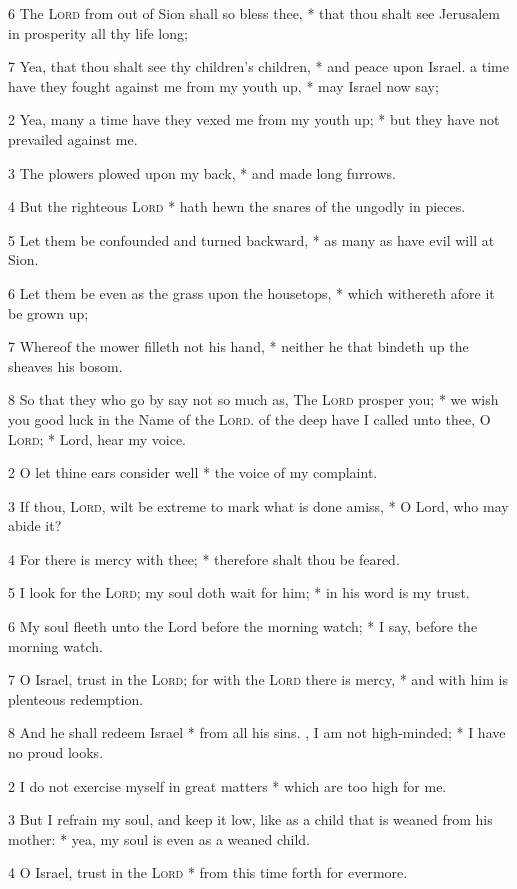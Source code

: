 6 The {\textsc{Lord}} from out of Sion shall so bless thee, * that thou shalt see Jerusalem in prosperity all thy life long;\par
7 Yea, that thou shalt see thy children's children, * and peace upon Israel.
 a time have they fought against me from my youth up, * may Israel now say;\par
2 Yea, many a time have they vexed me from my youth up; * but they have not prevailed against me.\par
3 The plowers plowed upon my back, * and made long furrows.\par
4 But the righteous {\textsc{Lord}} * hath hewn the snares of the ungodly in pieces.\par
5 Let them be confounded and turned backward, * as many as have evil will at Sion.\par
6 Let them be even as the grass upon the housetops, * which withereth afore it be grown up;\par
7 Whereof the mower filleth not his hand, * neither he that bindeth up the sheaves his bosom.\par
8 So that they who go by say not so much as, The {\textsc{Lord}} prosper you; * we wish you good luck in the Name of the {\textsc{Lord}}.
 of the deep have I called unto thee, O {\textsc{Lord}}; * Lord, hear my voice.\par
2 O let thine ears consider well * the voice of my complaint.\par
3 If thou, {\textsc{Lord}}, wilt be extreme to mark what is done amiss, * O Lord, who may abide it?\par
4 For there is mercy with thee; * therefore shalt thou be feared.\par
5 I look for the {\textsc{Lord}}; my soul doth wait for him; * in his word is my trust.\par
6 My soul fleeth unto the Lord before the morning watch; * I say, before the morning watch.\par
7 O Israel, trust in the {\textsc{Lord}}; for with the {\textsc{Lord}} there is mercy, * and with him is plenteous redemption.\par
8 And he shall redeem Israel * from all his sins.
, I am not high-minded; * I have no proud looks.\par
2 I do not exercise myself in great matters * which are too high for me.\par
3 But I refrain my soul, and keep it low, like as a child that is weaned from his mother: * yea, my soul is even as a weaned child.\par
4 O Israel, trust in the {\textsc{Lord}} * from this time forth for evermore.
